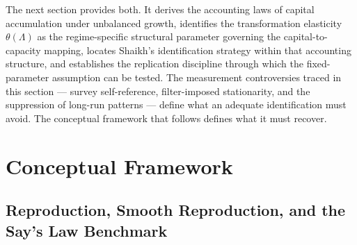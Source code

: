 \documentclass[11pt,a4paper]{article}
\begin{document}

The next section provides both. It derives the accounting laws of capital
accumulation under unbalanced growth, identifies the transformation
elasticity $\theta(\Lambda)$ as the regime-specific structural parameter
governing the capital-to-capacity mapping, locates Shaikh's identification
strategy within that accounting structure, and establishes the replication
discipline through which the fixed-parameter assumption can be tested. The
measurement controversies traced in this section --- survey self-reference,
filter-imposed stationarity, and the suppression of long-run patterns ---
define what an adequate identification must avoid. The conceptual framework
that follows defines what it must recover.


%
%



\section{Conceptual Framework}


\subsection{Reproduction, Smooth Reproduction, and the Say's Law Benchmark}
\label{sec:reproduction}
\end{document}
